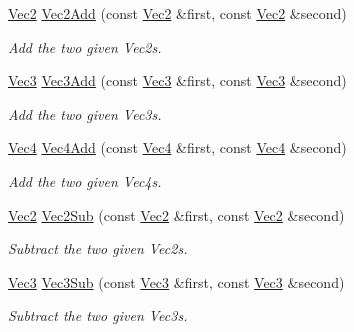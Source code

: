 {\bf }\par
\begin{DoxyCompactItemize}
\item 
\hyperlink{classgofxmath_1_1_vec2}{Vec2} \hyperlink{group___s_i_s_d_vec_math_gac9d2c898c69c771b9d9993a4c4f1a146}{Vec2\+Add} (const \hyperlink{classgofxmath_1_1_vec2}{Vec2} \&first, const \hyperlink{classgofxmath_1_1_vec2}{Vec2} \&second)
\begin{DoxyCompactList}\small\item\em Add the two given Vec2s. \end{DoxyCompactList}\item 
\hyperlink{classgofxmath_1_1_vec3}{Vec3} \hyperlink{group___s_i_s_d_vec_math_gac3979900225f137a1486a4491d0fb6d8}{Vec3\+Add} (const \hyperlink{classgofxmath_1_1_vec3}{Vec3} \&first, const \hyperlink{classgofxmath_1_1_vec3}{Vec3} \&second)
\begin{DoxyCompactList}\small\item\em Add the two given Vec3s. \end{DoxyCompactList}\item 
\hyperlink{classgofxmath_1_1_vec4}{Vec4} \hyperlink{group___s_i_s_d_vec_math_ga8812efd4565ada77e6dab63828ad715b}{Vec4\+Add} (const \hyperlink{classgofxmath_1_1_vec4}{Vec4} \&first, const \hyperlink{classgofxmath_1_1_vec4}{Vec4} \&second)
\begin{DoxyCompactList}\small\item\em Add the two given Vec4s. \end{DoxyCompactList}\item 
\hyperlink{classgofxmath_1_1_vec2}{Vec2} \hyperlink{group___s_i_s_d_vec_math_gabc910528ba2f4f4c3b69bf432e5c7731}{Vec2\+Sub} (const \hyperlink{classgofxmath_1_1_vec2}{Vec2} \&first, const \hyperlink{classgofxmath_1_1_vec2}{Vec2} \&second)
\begin{DoxyCompactList}\small\item\em Subtract the two given Vec2s. \end{DoxyCompactList}\item 
\hyperlink{classgofxmath_1_1_vec3}{Vec3} \hyperlink{group___s_i_s_d_vec_math_gae7189108aa879fb16ce9afd17052ac16}{Vec3\+Sub} (const \hyperlink{classgofxmath_1_1_vec3}{Vec3} \&first, const \hyperlink{classgofxmath_1_1_vec3}{Vec3} \&second)
\begin{DoxyCompactList}\small\item\em Subtract the two given Vec3s. \end{DoxyCompactList}\item 

\end{DoxyCompactItemize}
